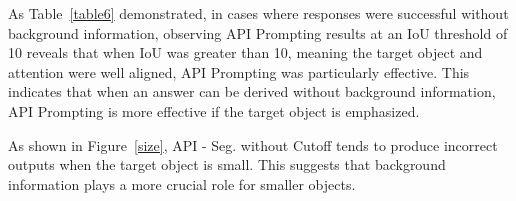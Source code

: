 As Table~\ref{table6} demonstrated, in cases where responses were successful without background information, observing API Prompting results at an IoU threshold of 10 reveals that when IoU was greater than 10, meaning the target object and attention were well aligned, API Prompting was particularly effective. This indicates that when an answer can be derived without background information, API Prompting is more effective if the target object is emphasized.  

As shown in Figure~\ref{size}, API - Seg. without Cutoff tends to produce incorrect outputs when the target object is small. This suggests that background information plays a more crucial role for smaller objects.